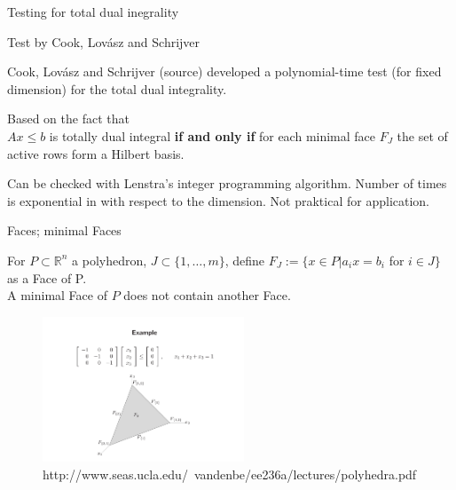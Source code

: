 \documentclass{beamer}
\begin{document}
\begin{frame}{Testing for total dual inegrality}

	\begin{block}{Test by Cook, Lovász and Schrijver} 

		Cook, Lovász and Schrijver (source) developed a polynomial-time test  (for fixed dimension) for the total dual integrality. \parskip=15pt

		Based on the fact that \\
		$Ax\leq b$ is totally dual integral \textbf{if and only if} for each minimal face $F_J$ the set of active rows form a Hilbert basis.
		\parskip=15pt
		
		Can be checked with Lenstra's integer programming algorithm. Number of times is exponential in with respect to the dimension. Not praktical for application.

	\end{block}
		
\end{frame}


\begin{frame}

	\begin{block}{Faces; minimal Faces}

		For $P\subset \mathbb{R}^n$ a polyhedron, $J\subset \{1,\dots , m\}$, define $F_J := \{x \in P | a_i x = b_i$ for $i \in J\}$ as a Face of P.\\
		A minimal Face of $P$ does not contain another Face.

	\end{block}

	\pause

	\begin{figure}[htp]
		\centering
		\includegraphics[width=6cm]{images/faces_example.png}
		\caption{http://www.seas.ucla.edu/~vandenbe/ee236a/lectures/polyhedra.pdf}
		\label{fig:faces_example}
	\end{figure}

\end{frame}
\end{document}
